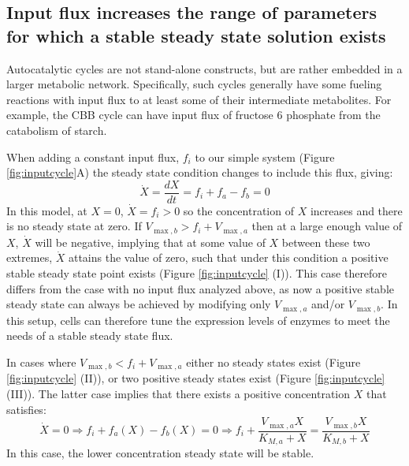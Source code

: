\documentclass[a4page,notitlepage]{article}
\begin{document}
\subsection{Input flux increases the range of parameters for which a stable steady state solution exists}
    Autocatalytic cycles are not stand-alone constructs, but are rather embedded in a larger metabolic network.
    Specifically, such cycles generally have some fueling reactions with input flux to at least some of their intermediate metabolites.
    For example, the CBB cycle can have input flux of fructose 6 phosphate from the catabolism of starch.

    When adding a constant input flux, $f_i$ to our simple system (Figure \ref{fig:inputcycle}A) the steady state condition changes to include this flux, giving:
    \begin{equation*}
      \dot X = \frac{dX}{dt} = f_i + f_a - f_b = 0
    \end{equation*}
    In this model, at $X=0$, $\dot X=f_i>0$ so the concentration of $X$ increases and there is no steady state at zero.
    If $V_{\max,b}>f_i+V_{\max,a}$ then at a large enough value of $X$, $\dot X$ will be negative, implying that at some value of $X$ between these two extremes, $\dot{X}$ attains the value of zero, such that under this condition a positive stable steady state point exists (Figure \ref{fig:inputcycle} (I)).
    This case therefore differs from the case with no input flux analyzed above, as now a positive stable steady state can always be achieved by modifying only $V_{\max,a}$ and/or $V_{\max,b}$.
    In this setup, cells can therefore tune the expression levels of enzymes to meet the needs of a stable steady state flux.

    In cases where $V_{\max,b}<f_i+V_{\max,a}$ either no steady states exist (Figure \ref{fig:inputcycle} (II)), or two positive steady states exist (Figure \ref{fig:inputcycle} (III)).
    The latter case implies that there exists a positive concentration $X$ that satisfies:
    \begin{equation*}
        \dot X = 0 \Rightarrow f_i + f_a(X) - f_b(X) = 0 \Rightarrow f_i+\frac{V_{\max,a}X}{K_{M,a}+X} = \frac{V_{\max,b}X}{K_{M,b}+X}
    \end{equation*}
  In this case, the lower concentration steady state will be stable.
\end{document}
